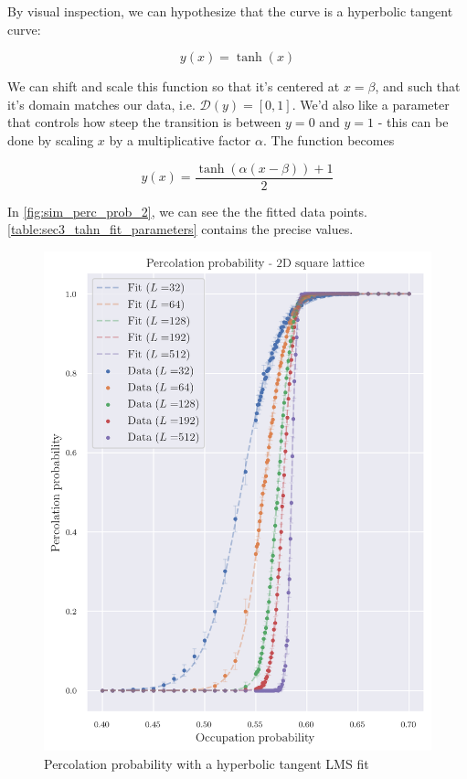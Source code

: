 By visual inspection, we can hypothesize that the curve is a hyperbolic tangent curve: 

$$ 
y(x) = \tanh(x)
$$

We can shift and scale this function so that it's centered at $x=\beta$, and such that it's domain matches our data, i.e. $\mathcal{D}(y) = \left[ 0, 1 \right]$. We'd also like a parameter that controls how steep the transition is between $y=0$ and $y=1$ - this can be done by scaling $x$ by a multiplicative factor $\alpha$. The function becomes

$$ 
y(x) = \frac{\tanh(\alpha(x - \beta)) + 1}{2}
$$ 

In \autoref{fig:sim_perc_prob_2}, we can see the the fitted data points. \autoref{table:sec3_tahn_fit_parameters} contains the precise values.


\begin{figure}[H]
  \includegraphics[width=\linewidth]{Images/sim_perc_prob_2.png}
  \caption{Percolation probability with a hyperbolic tangent LMS fit}
  \label{fig:sim_perc_prob_2}
\end{figure}

